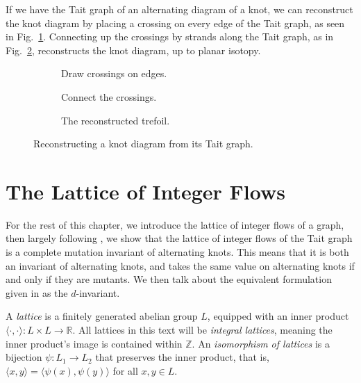 \documentclass[12pt]{report}
\newcommand{\R}{\mathbb{R}}
\newcommand{\Z}{\mathbb{Z}}
\newcommand{\ip}[2]{\langle #1, #2 \rangle}
\begin{document}
If we have the Tait graph of an alternating diagram of a knot, we can reconstruct the knot diagram by placing a crossing on every edge of the Tait graph, as seen in Fig.~\ref{fig:trefoil-tait-with-crossings}. Connecting up the crossings by strands along the Tait graph, as in Fig.~\ref{fig:trefoil-resconstructed},	 reconstructs the knot diagram, up to planar isotopy.

\begin{figure}[hbt]
	\centering
	\hspace*{\fill}
	\begin{subfigure}[b]{0.3 \textwidth}
		\centering
		\def\svgscale{0.22}
		
		\caption{Draw crossings on edges.}
		\label{fig:trefoil-tait-with-crossings}
	\end{subfigure}
	\hspace*{\fill}
	\begin{subfigure}[b]{0.3 \textwidth}
		\centering
		\def\svgscale{0.22}
		
		\caption{Connect the crossings.}
		\label{fig:trefoil-resconstructed}
	\end{subfigure}
	\hspace*{\fill}
	\begin{subfigure}[b]{0.3 \textwidth}
		\centering
		\def\svgscale{0.2}
		
		\caption{The reconstructed trefoil.}
		\label{fig:trefoil-resconstructed-isotopy}
	\end{subfigure}
	\hspace*{\fill}
	\caption{Reconstructing a knot diagram from its Tait graph.}
	\label{fig:tait-reconstruction-example}
\end{figure}

\section{The Lattice of Integer Flows}

For the rest of this chapter, we introduce the lattice of integer flows of a graph, then largely following \cite{lattices-graphs-mutation}, we show that the lattice of integer flows of the Tait graph is a complete mutation invariant of alternating knots. This means that it is both an invariant of alternating knots, and takes the same value on alternating knots if and only if they are mutants. We then talk about the equivalent formulation given in \cite{lattices-graphs-mutation} as the $d$-invariant.

A \textit{lattice} is a finitely generated abelian group $L$, equipped with an inner product 
\({\ip{\cdot}{\cdot}: L \times L \longrightarrow \R}\). All lattices in this text will be \textit{integral lattices}, meaning the inner product's image is contained within $\Z$. An \textit{isomorphism of lattices} is a bijection $\psi: L_{1} \longrightarrow L_{2}$ that preserves the inner product, that is, ${\ip{x}{y} = \ip{\psi(x)}{\psi(y)}}$ for all $x, y \in L$.
\end{document}
